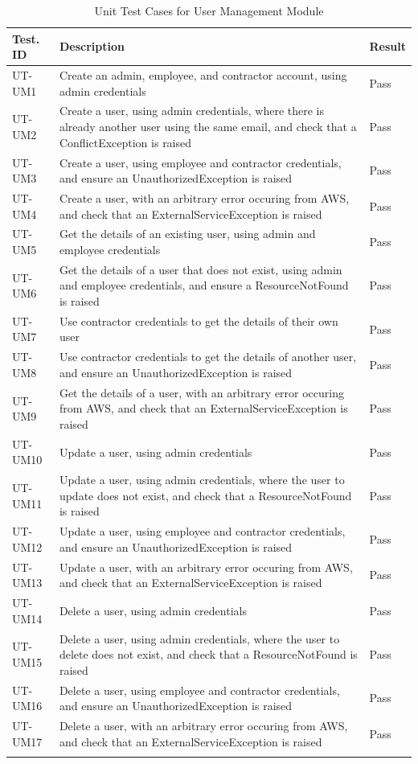\documentclass[12pt, titlepage]{article}
\begin{document}
\begin{longtable}{|m{2cm}|m{10cm}|m{1.4cm}|}
  \hline
  \textbf{Test. ID} & \textbf{Description} & \textbf{Result} \\ \hline
  UT-UM1 & Create an admin, employee, and contractor account, using
  admin credentials & Pass\\ \hline
  UT-UM2 & Create a user, using admin credentials, where there is
  already another user using the same email, and check that a
  ConflictException is raised & Pass\\ \hline
  UT-UM3 & Create a user, using employee and contractor credentials,
  and ensure an UnauthorizedException is raised & Pass\\ \hline
  UT-UM4 & Create a user, with an arbitrary error occuring from AWS,
  and check that an ExternalServiceException is raised & Pass\\ \hline
  UT-UM5 & Get the details of an existing user, using admin and
  employee credentials & Pass\\ \hline
  UT-UM6 & Get the details of a user that does not exist, using
  admin and employee credentials, and ensure a ResourceNotFound is
  raised & Pass\\ \hline
  UT-UM7 & Use contractor credentials to get the details of their
  own user & Pass\\ \hline
  UT-UM8 & Use contractor credentials to get the details of another
  user, and ensure an UnauthorizedException is raised & Pass\\ \hline
  UT-UM9 & Get the details of a user, with an arbitrary error
  occuring from AWS, and check that an ExternalServiceException is
  raised & Pass\\ \hline
  UT-UM10 & Update a user, using admin credentials & Pass\\ \hline
  UT-UM11 & Update a user, using admin credentials, where the user
  to update does not exist, and check that a ResourceNotFound is
  raised & Pass\\ \hline
  UT-UM12 & Update a user, using employee and contractor
  credentials, and ensure an UnauthorizedException is raised & Pass\\ \hline
  UT-UM13 & Update a user, with an arbitrary error occuring from
  AWS, and check that an ExternalServiceException is raised & Pass\\ \hline
  UT-UM14 & Delete a user, using admin credentials & Pass\\ \hline
  UT-UM15 & Delete a user, using admin credentials, where the user
  to delete does not exist, and check that a ResourceNotFound is
  raised & Pass\\ \hline
  UT-UM16 & Delete a user, using employee and contractor
  credentials, and ensure an UnauthorizedException is raised & Pass\\ \hline
  UT-UM17 & Delete a user, with an arbitrary error occuring from
  AWS, and check that an ExternalServiceException is raised & Pass\\ \hline
  \caption{Unit Test Cases for User Management Module}
\end{longtable}
\end{document}

